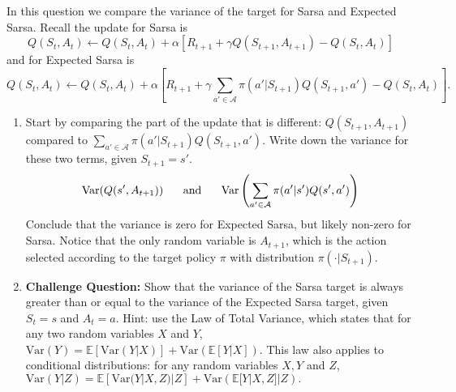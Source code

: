 In this question we compare the variance of the target for Sarsa and Expected Sarsa. Recall the update for Sarsa is 
$$ Q(S_{t}, A_{t}) \leftarrow Q(S_{t}, A_{t}) + \alpha \left[  R_{t+1} + \gamma Q(S_{t+1}, A_{t+1}) - Q(S_{t}, A_{t})\right]$$
and for Expected Sarsa is
$$ Q(S_{t}, A_{t}) \leftarrow Q(S_{t}, A_{t}) + \alpha \left[  R_{t+1} + \gamma \sum_{a' \in \mathcal{A}} \pi(a' | S_{t+1}) Q(S_{t+1}, a')  - Q(S_{t}, A_{t})\right].$$
\begin{enumerate}
\item Start by comparing the part of the update that is different: $Q(S_{t+1}, A_{t+1})$ compared to $\sum_{a' \in \mathcal{A}} \pi(a' | S_{t+1}) Q(S_{t+1}, a') $. Write down the variance for these two terms, given $S_{t+1} = s'$.
%
\begin{equation*}
\text{Var}(Q(s', A_{t+1})) \hspace{0.5cm} \text{ and }  \hspace{0.5cm}
\text{Var}\left(\sum_{a' \in \mathcal{A}} \pi(a' | s')Q(s', a')\right)
\end{equation*}
%
Conclude that the variance is zero for Expected Sarsa, but likely non-zero for Sarsa. Notice that the only random variable is $A_{t+1}$, which is the action selected according to the target policy $\pi$ with distribution $\pi(\cdot | S_{t+1})$. 
\item \textbf{Challenge Question:} Show that the variance of the Sarsa target is always greater than or equal to the variance of the Expected Sarsa target, given $S_t = s$ and $A_t = a$. Hint: use the Law of Total Variance, which states that for any two random variables $X$ and $Y$, $\text{Var}(Y) = \mathbb{E}[\text{Var}(Y|X)] + \text{Var}(\mathbb{E}[Y|X])$. This law also applies to conditional distributions: for any random variables $X, Y$ and $Z$, $\text{Var}(Y | Z) = \mathbb{E}[\text{Var}(Y|X,Z) | Z] + \text{Var}(\mathbb{E}[Y|X, Z] | Z).$
\end{enumerate}

